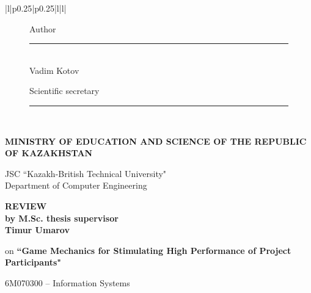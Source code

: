 \begin{titlepage}
\begin{centering}
\begin{longtable}{|l|p{0.25\textwidth}|p{0.25\textwidth}|l|l|}
            \hline

            \end{longtable}
        \end{centering}

        \begin{figure}[ht]
            \begin{minipage}[t]{0.5\linewidth}
                Author\\

                \rule{13em}{0.4pt}\\
                Vadim Kotov\\
            \end{minipage}
            \begin{minipage}[t]{0.5\linewidth}
                Scientific secretary\\

                \rule{13em}{0.4pt}\\
            \end{minipage}
        \end{figure}
        
        \pagebreak

    \begin{centering}
        {\bf{\MakeUppercase{Ministry of education and science of the republic of Kazakhstan}}

        \vspace{14pt}

        JSC ``Kazakh-British Technical University"\\
        Department of Computer Engineering}
       \vspace{14pt}

        {\bf
        \MakeUppercase{Review}\\
        by M.Sc. thesis supervisor\\
        Timur Umarov
        }

        \vspace{14pt}
        
        on     {\bf``Game Mechanics for Stimulating High Performance of Project Participants"}
        
        \vspace{14pt}
        
        6M070300 -- Information Systems

    \end{centering}
    
    


\end{titlepage}
